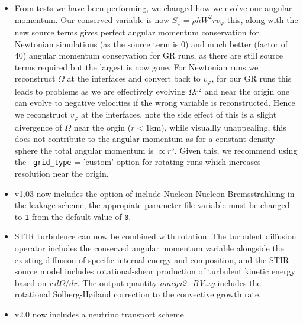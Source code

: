 \documentclass[10pt,nofootinbib]{article}
\newcommand{\code}[1]{\texttt{#1}}
\begin{document}
\begin{itemize}
\item From tests we have been performing, we changed how we evolve our
  angular momentum.  Our conserved variable is now $S_\phi = \rho h W^2
  r v_\varphi$ this, along with the new source terms gives perfect
  angular momentum conservation for Newtonian simulations (as the
  source term is 0) and much better (factor of 40) angular momentum
  conservation for GR runs, as there are still source terms required
  but the largest is now gone.  For Newtonian runs we reconstruct
  $\Omega$ at the interfaces and convert back to $v_\varphi$, for our
  GR runs this leads to problems as we are effectively evolving
  $\Omega r^2$ and near the origin one can evolve to negative
  velocities if the wrong variable is reconstructed.  Hence we
  reconstruct $v_\varphi$ at the interfaces, note the side effect of
  this is a slight divergence of $\Omega$ near the orgin ($r<1$km),
  while visuallly unappealing, this does not contribute to the angular
  momentum as for a constant density sphere the total angular momentum
  is $\propto r^5$. Given this, we recommend using the {\tt
    grid\_type} = 'custom' option for rotating runs which increases
  resolution near the origin.
\item v1.03 now includes the option of include Nucleon-Nucleon
  Bremsstrahlung in the leakage scheme, the appropiate parameter file
  variable must be changed to \code{1} from the default value of
  \code{0}.
\item STIR turbulence can now be combined with rotation. The turbulent
  diffusion operator includes the conserved angular momentum variable
  alongside the existing diffusion of specific internal energy and
  composition, and the STIR source model includes rotational-shear
  production of turbulent kinetic energy based on $r\,d\Omega/dr$.
  The output quantity {\emph{omega2\_BV.xg}} includes the rotational
  Solberg-H\o iland correction to the convective growth rate.
\item v2.0 now includes a neutrino transport scheme.
\end{itemize}
\end{document}
